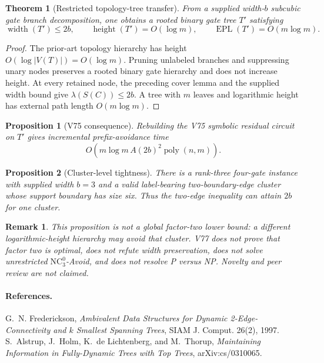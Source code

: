 \documentclass[11pt]{article}
\newtheorem{theorem}{Theorem}
\newtheorem{proposition}{Proposition}
\newtheorem{remark}{Remark}
\begin{document}
\begin{theorem}[Restricted topology-tree transfer]
From a supplied width-$b$ subcubic gate branch decomposition, one obtains a
rooted binary gate tree $T'$ satisfying
\[
 \operatorname{width}(T')\le 2b,
 \qquad \operatorname{height}(T')=O(\log m),
 \qquad \operatorname{EPL}(T')=O(m\log m).
\]
\end{theorem}

\begin{proof}
The prior-art topology hierarchy has height $O(\log |V(T)|)=O(\log m)$.
Pruning unlabeled branches and suppressing unary nodes preserves a rooted binary
gate hierarchy and does not increase height. At every retained node, the
preceding cover lemma and the supplied width bound give
$\lambda(S(C))\le 2b$. A tree with $m$ leaves and logarithmic height has
external path length $O(m\log m)$.
\end{proof}

\begin{proposition}[V75 consequence]
Rebuilding the V75 symbolic residual circuit on $T'$ gives incremental
prefix-avoidance time
\[
 O\!\left(m\log m\,A(2b)^2\operatorname{poly}(n,m)\right).
\]
\end{proposition}

\begin{proposition}[Cluster-level tightness]
There is a rank-three four-gate instance with supplied width $b=3$ and a valid
label-bearing two-boundary-edge cluster whose support boundary has size six.
Thus the two-edge inequality can attain $2b$ for one cluster.
\end{proposition}

\begin{remark}
This proposition is not a global factor-two lower bound: a different
logarithmic-height hierarchy may avoid that cluster. V77 does not prove that
factor two is optimal, does not refute width preservation, does not solve
unrestricted \(\mathrm{NC}^0_3\)-Avoid, and does not resolve P versus NP.
Novelty and peer review are not claimed.
\end{remark}

\paragraph{References.}
G.~N. Frederickson, \emph{Ambivalent Data Structures for Dynamic
2-Edge-Connectivity and $k$ Smallest Spanning Trees}, SIAM J. Comput. 26(2),
1997. S.~Alstrup, J.~Holm, K.~de Lichtenberg, and M.~Thorup,
\emph{Maintaining Information in Fully-Dynamic Trees with Top Trees},
arXiv:cs/0310065.
\end{document}
